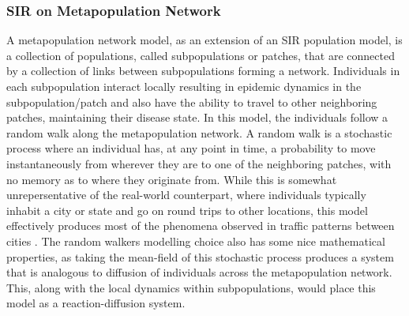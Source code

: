\subsubsection{SIR on Metapopulation Network}
A metapopulation network model, as an extension of an SIR population model, is a collection of populations, called subpopulations or patches, that are connected by a collection of links between subpopulations forming a network. Individuals in each subpopulation interact locally resulting in epidemic dynamics in the subpopulation/patch and also have the ability to travel to other neighboring patches, maintaining their disease state. In this model, the individuals follow a random walk along the metapopulation network. A random walk is a stochastic process where an individual has, at any point in time, a probability to move instantaneously from wherever they are to one of the neighboring patches, with no memory as to where they originate from.
While this is somewhat unrepersentative of the real-world counterpart, where individuals typically inhabit a city or state and go on round trips to other locations, this model effectively produces most of the phenomena observed in traffic patterns between cities \cite{shao2022epidemic}.
The random walkers modelling choice also has some nice mathematical properties, as taking the mean-field of this stochastic process produces a system that is analogous to diffusion of individuals across the metapopulation network\cite{masuda2017random}.
This, along with the local dynamics within subpopulations, would place this model as a reaction-diffusion system\cite{colizza2007reaction}.\\



